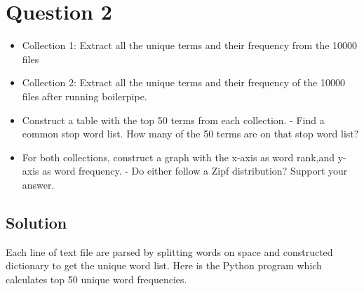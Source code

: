 
\section{Question 2}
\label{part2}
\begin{itemize} 
\item Collection 1: Extract all the unique terms and their frequency from the 10000 files

\item Collection 2: Extract all the unique terms and their frequency of the 10000 files after 
	  running boilerpipe.
\item Construct a table with the top 50 terms from each collection.
	  - Find a common stop word list. How many of the 50 terms are on that stop word list?
\item For both collections, construct a graph with the x-axis as word rank,and y-axis as word frequency.
	  - Do either follow a Zipf distribution? Support your answer.
\end{itemize}

\subsection{Solution}

Each line of text file are parsed by splitting words on space and constructed dictionary to get the unique word list.
Here is the Python program which calculates top 50 unique word frequencies.

